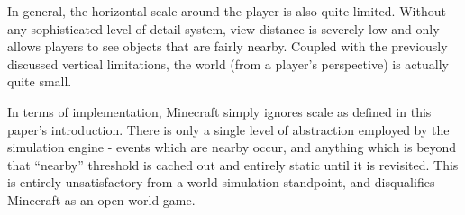 In general, the horizontal scale around the player is also quite limited. Without any sophisticated level-of-detail system, view distance is severely low
and only allows players to see objects that are fairly nearby. Coupled with the previously discussed vertical limitations, the world (from a player's perspective) is actually quite small.

In terms of implementation, Minecraft simply ignores scale as defined in this paper's introduction. There is only a single level of abstraction employed by
the simulation engine - events which are nearby occur, and anything which is beyond that ``nearby'' threshold is cached out and entirely static until it is
revisited. This is entirely unsatisfactory from a world-simulation standpoint, and disqualifies Minecraft as an open-world game.

